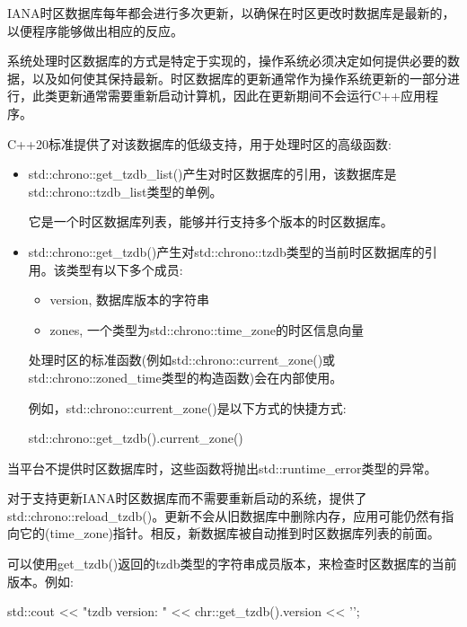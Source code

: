 
IANA时区数据库每年都会进行多次更新，以确保在时区更改时数据库是最新的，以便程序能够做出相应的反应。

系统处理时区数据库的方式是特定于实现的，操作系统必须决定如何提供必要的数据，以及如何使其保持最新。时区数据库的更新通常作为操作系统更新的一部分进行，此类更新通常需要重新启动计算机，因此在更新期间不会运行C++应用程序。

C++20标准提供了对该数据库的低级支持，用于处理时区的高级函数:

\begin{itemize}
\item
std::chrono::get\_tzdb\_list()产生对时区数据库的引用，该数据库是std::chrono::tzdb\_list类型的单例。

它是一个时区数据库列表，能够并行支持多个版本的时区数据库。

\item
std::chrono::get\_tzdb()产生对std::chrono::tzdb类型的当前时区数据库的引用。该类型有以下多个成员:

\begin{itemize}
\item
version, 数据库版本的字符串

\item
zones, 一个类型为std::chrono::time\_zone的时区信息向量
\end{itemize}

处理时区的标准函数(例如std::chrono::current\_zone()或std::chrono::zoned\_time类型的构造函数)会在内部使用。

例如，std::chrono::current\_zone()是以下方式的快捷方式:

\begin{cpp}
std::chrono::get_tzdb().current_zone()
\end{cpp}
\end{itemize}

当平台不提供时区数据库时，这些函数将抛出std::runtime\_error类型的异常。

对于支持更新IANA时区数据库而不需要重新启动的系统，提供了std::chrono::reload\_tzdb()。更新不会从旧数据库中删除内存，应用可能仍然有指向它的(time\_zone)指针。相反，新数据库被自动推到时区数据库列表的前面。

可以使用get\_tzdb()返回的tzdb类型的字符串成员版本，来检查时区数据库的当前版本。例如:

\begin{cpp}
std::cout << "tzdb version: " << chr::get_tzdb().version << '\n';
\end{cpp}

